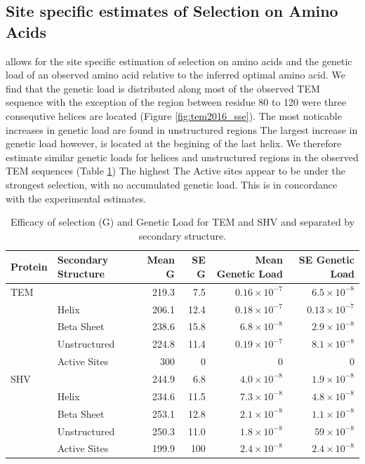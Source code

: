 \documentclass[12pt]{article}
\begin{document}
\subsection*{Site specific estimates of Selection on Amino Acids}
\selac allows for the site specific estimation of selection on amino acids and the genetic load of an observed amino acid relative to the inferred optimal amino acid.
We find that the genetic load is distributed along most of the observed TEM sequence with the exception of the region between residue 80 to 120 were three consequtive helices are located (Figure \ref{fig:tem2016_sse}). 
The most noticable increases in genetic load are found in unstructured regions
The largest increase in genetic load however, is located at the begining of the last helix.
We therefore estimate similar genetic loads for helices and unstructured regions in the observed TEM sequences (Table \ref{tab:selection})
The highest 
The Active sites appear to be under the strongest selection, with no accumulated genetic load.
This is in concordance with the experimental estimates.

\begin{table}
  \centering
  \begin{tabular}{llrrrr}
    Protein & Secondary Structure	& Mean G & SE G & Mean Genetic Load & SE Genetic Load \\ \hline 
    TEM	&		& 219.3 & 7.5 & $0.16\times10^{-7}$ & $6.5\times10^{-8}$ \\
    &Helix 		& 206.1 & 12.4 & $0.18\times10^{-7}$ & $0.13\times10^{-7}$ \\
    &Beta Sheet 	& 238.6 & 15.8 & $6.8\times10^{-8}$ & $2.9\times10^{-8}$ \\
    &Unstructured 	& 224.8 & 11.4 & $0.19\times10^{-7}$ & $8.1\times10^{-8}$ \\
    &Active Sites 	& 300   & 0    & 0      & 0      \\ \hline
    
    SHV&		& 244.9 & 6.8  & $4.0\times10^{-8}$ & $1.9\times10^{-8}$ \\
    &Helix		& 234.6 & 11.5 & $7.3\times10^{-8}$ & $4.8\times10^{-8}$ \\
    &Beta Sheet 	& 253.1 & 12.8 & $2.1\times10^{-8}$ & $1.1\times10^{-8}$ \\
    &Unstructured	& 250.3 & 11.0 & $1.8\times10^{-8}$ & $59\times10^{-8}$  \\
    &Active Sites	& 199.9 & 100  & $2.4\times10^{-8}$ & $2.4\times10^{-8}$ \\

  \end{tabular}
  \caption{Efficacy of selection (G) and Genetic Load for TEM and SHV and separated by secondary structure.}
  \label{tab:selection}
\end{table}
\end{document}
